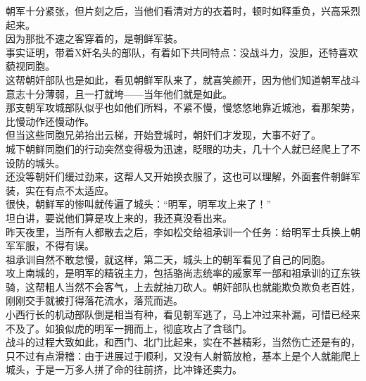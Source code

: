 \begin{multicols}{\theparacolNo}
朝军十分紧张，但片刻之后，当他们看清对方的衣着时，顿时如释重负，兴高采烈起来。\\

因为那批不速之客穿着的，是朝鲜军装。\\

事实证明，带着X奸名头的部队，有着如下共同特点：没战斗力，没胆，还特喜欢藐视同胞。\\

这帮朝奸部队也是如此，看见朝鲜军队来了，就喜笑颜开，因为他们知道朝军战斗意志十分薄弱，且一打就垮——当年他们就是如此。\\

那支朝军攻城部队似乎也如他们所料，不紧不慢，慢悠悠地靠近城池，看那架势，比慢动作还慢动作。\\

但当这些同胞兄弟抬出云梯，开始登城时，朝奸们才发现，大事不好了。\\

城下朝鲜同胞们的行动突然变得极为迅速，眨眼的功夫，几十个人就已经爬上了不设防的城头。\\

还没等朝奸们缓过劲来，这帮人又开始换衣服了，这也可以理解，外面套件朝鲜军装，实在有点不太适应。\\

很快，朝鲜军的惨叫就传遍了城头：“明军，明军攻上来了！”\\

坦白讲，要说他们算是攻上来的，我还真没看出来。\\

昨天夜里，当所有人都散去之后，李如松交给祖承训一个任务：给明军士兵换上朝军军服，不得有误。\\

祖承训自然不敢怠慢，就这样，第二天，城头上的朝军看见了自己的同胞。\\

攻上南城的，是明军的精锐主力，包括骆尚志统率的戚家军一部和祖承训的辽东铁骑，这帮粗人当然不会客气，上去就抽刀砍人。朝奸部队也就能欺负欺负老百姓，刚刚交手就被打得落花流水，落荒而逃。\\

小西行长的机动部队倒是相当有种，看见朝军逃了，马上冲过来补漏，可惜已经来不及了。如狼似虎的明军一拥而上，彻底攻占了含毯门。\\

战斗的过程大致如此，和西门、北门比起来，实在不甚精彩，当然伤亡还是有的，只不过有点滑稽：由于进展过于顺利，又没有人射箭放枪，基本上是个人就能爬上城头，于是一万多人拼了命的往前挤，比冲锋还卖力。\\


\end{multicols}
